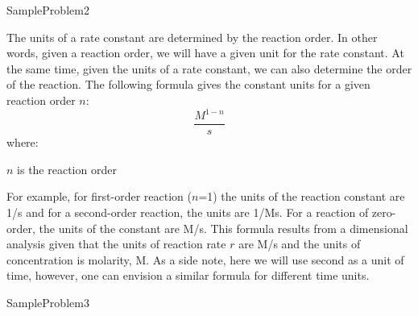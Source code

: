 \documentclass[main.tex]{subfiles}
\newcommand\chapterlabel{Ch-kinetics}
\begin{document}
\begin{description}
  {SampleProblem2}


The units of a rate constant are determined by the reaction order. In other words, given a reaction order, we will have a given unit for the rate constant. At the same time, given the units of a rate constant, we can also determine the order of the reaction. The following formula gives the constant units for a given reaction order $n$:
\begin{equation}
\boxed{\frac{M^{1-n}}{s} }
\label{\chapterlabel:equation3}
\end{equation}
where:
\begin{where}
 \item $n$   is the reaction order
\end{where}
For example, for first-order reaction ($n$=1) the units of the reaction constant are 1/s and for a second-order reaction, the units are 1/Ms. For a reaction of zero-order, the units of the constant are M/s. This formula results from a dimensional analysis given that the units of reaction rate $r$ are M/s and the units of concentration is molarity, M. As a side note, here we will use second as a unit of time, however, one can envision a similar formula for different time units.

  {SampleProblem3}



\end{description}
\end{document}
